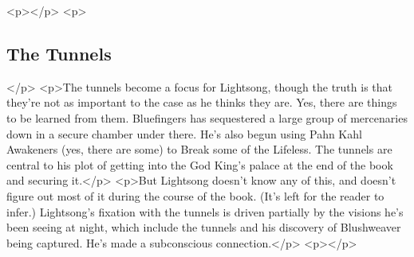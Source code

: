 <p></p>
<p>\subsection*{The Tunnels}</p>
<p>The tunnels become a focus for Lightsong, though the truth is that they’re not as important to the case as he thinks they are. Yes, there are things to be learned from them. Bluefingers has sequestered a large group of mercenaries down in a secure chamber under there. He’s also begun using Pahn Kahl Awakeners (yes, there are some) to Break some of the Lifeless. The tunnels are central to his plot of getting into the God King’s palace at the end of the book and securing it.</p>
<p>But Lightsong doesn’t know any of this, and doesn’t figure out most of it during the course of the book. (It’s left for the reader to infer.) Lightsong’s fixation with the tunnels is driven partially by the visions he’s been seeing at night, which include the tunnels and his discovery of Blushweaver being captured. He’s made a subconscious connection.</p>
<p></p>



